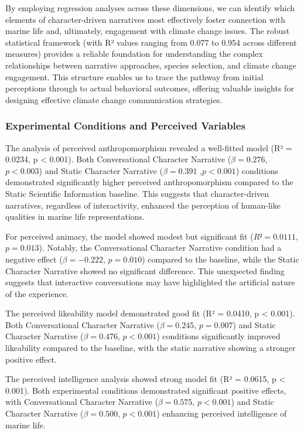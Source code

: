 \documentclass[sigconf, nonacm]{acmart}
\begin{document}
By employing regression analyses across these dimensions, we can identify which elements of character-driven narratives most effectively foster connection with marine life and, ultimately, engagement with climate change issues. The robust statistical framework (with R² values ranging from 0.077 to 0.954 across different measures) provides a reliable foundation for understanding the complex relationships between narrative approaches, species selection, and climate change engagement. This structure enables us to trace the pathway from initial perceptions through to actual behavioral outcomes, offering valuable insights for designing effective climate change communication strategies.

\subsubsection{Experimental Conditions and Perceived Variables}
The analysis of perceived anthropomorphism revealed a well-fitted model (R² = 0.0234, p < 0.001). Both Conversational Character Narrative ($\beta = 0.276$, $p < 0.003$) and Static Character Narrative ($\beta = 0.391$ ,$p < 0.001$) conditions demonstrated significantly higher perceived anthropomorphism compared to the Static Scientific Information baseline. This suggests that character-driven narratives, regardless of interactivity, enhanced the perception of human-like qualities in marine life representations.

For perceived animacy, the model showed modest but significant fit ($R² = 0.0111$, $p =0.013$). Notably, the Conversational Character Narrative condition had a negative effect ($\beta = -0.222$, $p =0.010$) compared to the baseline, while the Static Character Narrative showed no significant difference. This unexpected finding suggests that interactive conversations may have highlighted the artificial nature of the experience.

The perceived likeability model demonstrated good fit (R² = 0.0410, p < 0.001). Both Conversational Character Narrative ($\beta = 0.245$, $p =0.007$) and Static Character Narrative ($\beta = 0.476$, $p < 0.001$) conditions significantly improved likeability compared to the baseline, with the static narrative showing a stronger positive effect.

The perceived intelligence analysis showed strong model fit (R² = 0.0615, p < 0.001). Both experimental conditions demonstrated significant positive effects, with Conversational Character Narrative ($\beta = 0.575$, $p < 0.001$) and Static Character Narrative ($\beta = 0.500$, $p < 0.001$) enhancing perceived intelligence of marine life.
\end{document}
